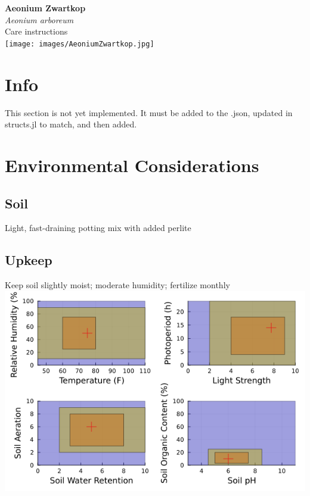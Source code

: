 \documentclass{article}
\begin{document}
\begin{center}
    {\fontsize{36}{24}\selectfont \textbf{Aeonium Zwartkop}} \\
    {\fontsize{18}{24}\selectfont \textit{Aeonium arboreum}} \\
    \vspace{30pt}
    {\fontsize{20}{24}\selectfont Care instructions}\\
    \vspace{30pt} 
    \texttt{[image: images/AeoniumZwartkop.jpg]}
\end{center}

\newpage

\section*{Info}
This section is not yet implemented. It must be added to the .json, updated in structs.jl to match, and then added.

\section*{Environmental Considerations}
\subsection*{Soil}
Light, fast-draining potting mix with added perlite
\subsection*{Upkeep}
Keep soil slightly moist; moderate humidity; fertilize monthly
\newline \newline \newline
\includegraphics[width=.9\textwidth]{intermediate/plots/AeoniumZwartkop.png}
\end{document}
